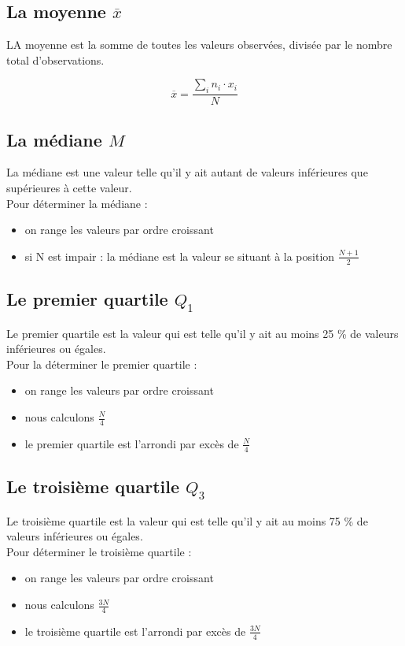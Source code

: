 \documentclass[utf8, a4paper, 12 pt]{article}
\begin{document}
    \subsection{La moyenne \(\overline{x}\)}
    LA moyenne est la somme de toutes les valeurs observées, divisée par le nombre total 
    d'observations.

    \[\overline{x} =\frac{ \sum_{i} {n_i\cdot x_i} }{N}\]

    \subsection{La médiane $M$}
    La médiane est une valeur telle qu'il y ait autant de valeurs inférieures 
    que supérieures à cette valeur.\\
    Pour déterminer la médiane :\begin{itemize}
        \item on range les valeurs par ordre croissant
        \item si N est impair : la médiane est la valeur se situant à la position \(\frac{N+1}{2}\)
    \end{itemize} \vspace{1\baselineskip}
    \subsection{Le premier quartile $Q_1$}
    Le premier quartile est la valeur qui est telle qu'il y ait au moins 25 \% de valeurs inférieures ou égales.\\
    Pour la déterminer le premier quartile :\begin{itemize}
        \item on range les valeurs par ordre croissant
        \item nous calculons  $\frac{N}{4}$\
        \item le premier quartile est l'arrondi par excès de  $\frac{N}{4}$\     
    \end{itemize} \vspace{1\baselineskip}

    \subsection{Le troisième quartile $Q_3$}
    Le troisième quartile est la valeur qui est telle qu'il y ait au moins 75 \% de valeurs inférieures ou égales.\\
    Pour déterminer le troisième quartile :\begin{itemize}
        \item on range les valeurs par ordre croissant
        \item nous calculons  $\frac{3N}{4}$\
        \item le troisième quartile est l'arrondi par excès de  $\frac{3N}{4}$\     
    \end{itemize} \vspace{1\baselineskip}
\end{document}
